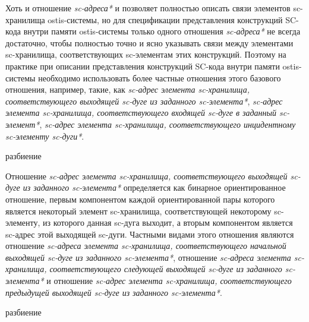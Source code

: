 Хоть и отношение \textit{sc-адреса*} и позволяет полностью описать связи элементов sc-хранилища ostis-системы, но для спецификации представления конструкций SC-кода внутри памяти ostis-системы только одного отношения \textit{sc-адреса*} не всегда достаточно, чтобы полностью точно и ясно указывать связи между элементами sc-хранилища, соответствующих sc-элементам этих конструкций. Поэтому на практике при описании представления конструкций SC-кода внутри памяти ostis-системы необходимо использовать более частные отношения этого базового отношения, например, такие, как \textit{sc-адрес элемента sc-хранилища, соответствующего выходящей sc-дуге из заданного sc-элемента*}, \textit{sc-адрес элемента sc-хранилища, соответствующего входящей sc-дуге в заданный sc-элемент*}, \textit{sc-адрес элемента sc-хранилища, соответствующего инцидентному sc-элементу sc-дуги*}.

\begin{SCn}
\begin{scnrelfromset}{разбиение}
\end{scnrelfromset}
\end{SCn}

Отношение \textit{sc-адрес элемента sc-хранилища, соответствующего выходящей sc-дуге из заданного sc-элемента*} определяется как бинарное ориентированное отношение, первым компонентом каждой ориентированной пары которого является некоторый элемент sc-хранилища, соответствующей некоторому sc-элементу, из которого данная sc-дуга выходит, а вторым компонентом является sc-адрес этой выходящей sc-дуги. Частными видами этого отношения являются отношение \textit{sc-адреса элемента sc-хранилища, соответствующего начальной выходящей sc-дуге из заданного sc-элемента*}, отношение \textit{sc-адреса элемента sc-хранилища, соответствующего следующей выходящей sc-дуге из заданного sc-элемента*} и отношение \textit{sc-адрес элемента sc-хранилища, соответствующего предыдущей выходящей sc-дуге из заданного sc-элемента*}.

\begin{SCn}
\begin{scnrelfromset}{разбиение}
\end{scnrelfromset}
\end{SCn}

